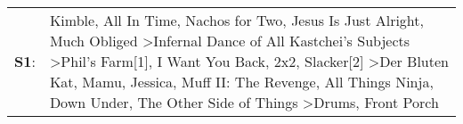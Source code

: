 \begin{supertabular}{p{0.03\textwidth}p{0.92\textwidth}}
 \textbf{S1}:  &  Kimble\textsuperscript{}, \enspace All In Time\textsuperscript{}, \enspace Nachos for Two\textsuperscript{}, \enspace Jesus Is Just Alright\textsuperscript{}, \enspace Much Obliged\textsuperscript{} \textgreater \enspace Infernal Dance of All Kastchei's Subjects\textsuperscript{} \textgreater \enspace Phil's Farm[1]\textsuperscript{}, \enspace I Want You Back\textsuperscript{}, \enspace 2x2\textsuperscript{}, \enspace Slacker[2]\textsuperscript{} \textgreater \enspace Der Bluten Kat\textsuperscript{}, \enspace Mamu\textsuperscript{}, \enspace Jessica\textsuperscript{}, \enspace Muff II: The Revenge\textsuperscript{}, \enspace All Things Ninja\textsuperscript{}, \enspace Down Under\textsuperscript{}, \enspace The Other Side of Things\textsuperscript{} \textgreater \enspace Drums\textsuperscript{}, \enspace Front Porch\textsuperscript{}  \enspace  \\
\end{supertabular}
